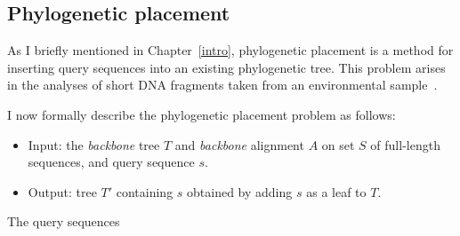 \subsection{Phylogenetic placement}
As I briefly mentioned in Chapter~\ref{intro}, phylogenetic placement is a method for inserting query sequences into an existing phylogenetic tree.  This problem arises in the analyses of short DNA fragments taken from an environmental sample~\cite{todo}.

I now formally describe the phylogenetic placement problem as follows:



\begin{itemize}
\item Input: the {\em backbone} tree $T$ and {\em backbone} alignment $A$ on set $S$ of full-length sequences,
and query sequence $s$.
\item Output: tree $T'$ containing $s$ obtained by adding $s$ as a leaf to
$T$.
\end{itemize}

The query sequences

